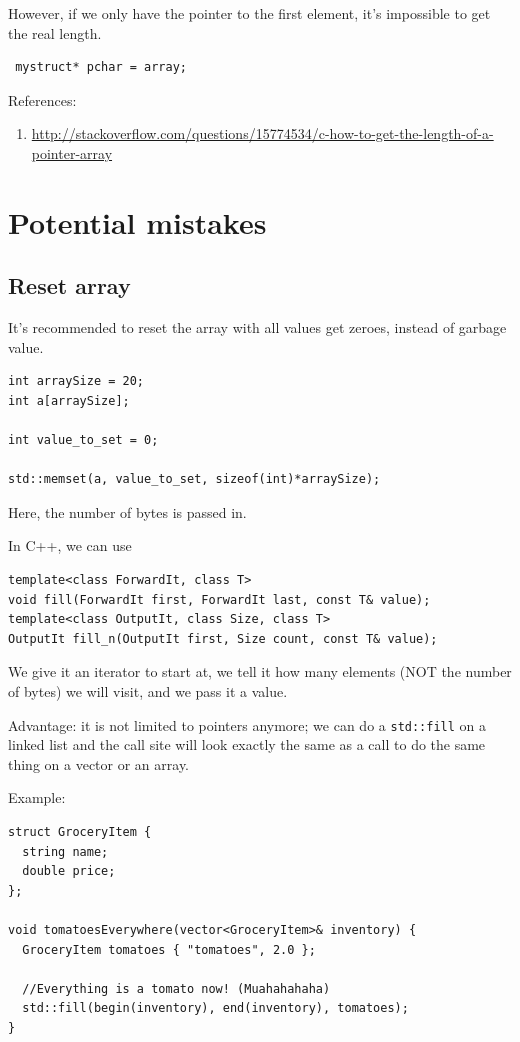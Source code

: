 However, if we only have the pointer to the first element, it's impossible to
get the real length.
\begin{verbatim}
 mystruct* pchar = array;
\end{verbatim}


References:
\begin{enumerate}
  \item
  \url{http://stackoverflow.com/questions/15774534/c-how-to-get-the-length-of-a-pointer-array}
\end{enumerate}
\section{Potential mistakes}
\label{sec:potential-mistakes}

\subsection{Reset array}

It's recommended to reset the array with all values get zeroes, instead of
garbage value.

\begin{lstlisting}
int arraySize = 20;
int a[arraySize];

int value_to_set = 0;

std::memset(a, value_to_set, sizeof(int)*arraySize);
\end{lstlisting}
Here, the number of bytes is passed in.

In C++, we can use
\begin{lstlisting}
template<class ForwardIt, class T>
void fill(ForwardIt first, ForwardIt last, const T& value);
template<class OutputIt, class Size, class T>
OutputIt fill_n(OutputIt first, Size count, const T& value);
\end{lstlisting}
We give it an iterator to start at, we tell it how many elements (NOT the
number of bytes) we will visit, and we pass it a value.

Advantage: it is not limited to pointers anymore; we can do a \verb!std::fill!
on a linked list and the call site will look exactly the same as a call to do the
same thing on a vector or an array.

Example:
\begin{lstlisting}
struct GroceryItem {
  string name;
  double price;
};

void tomatoesEverywhere(vector<GroceryItem>& inventory) {
  GroceryItem tomatoes { "tomatoes", 2.0 };
  
  //Everything is a tomato now! (Muahahahaha)
  std::fill(begin(inventory), end(inventory), tomatoes);
}
\end{lstlisting}

